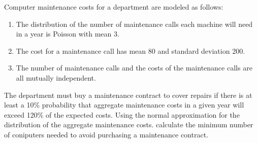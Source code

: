 Computer maintenance costs for a department are modeled as follows: 
\begin{enumerate}
\item The distribution of the number of maintenance calls each machine will need in a year is Poisson with mean 3. 
\item The cost for a maintenance call has mean 80 and standard deviation 200. 
\item The number of maintenance calls and the costs of the maintenance calls are all mutually independent. 
\end{enumerate}
The department must buy a maintenance contract to cover repairs if there is at least a 10\% probability that aggregate maintenance costs in a given year will exceed 120\% of the expected costs. 
\medskip
Using the normal approximation for the distribution of the aggregate maintenance costs. calculate the minimum number of coniputers needed to avoid purchasing a maintenance contract. 





